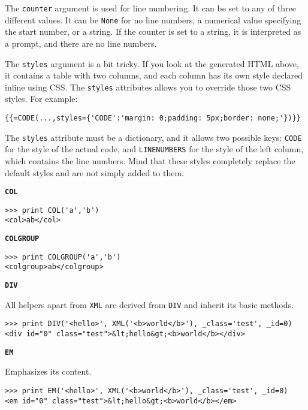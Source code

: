 \documentclass[justified,sixbynine,notoc]{tufte-book}
\def\ft{\small\tt}
\def\inxx#1{\index{#1}}
\begin{document}
\begin{fullwidth}
The {\ft counter} argument is used for line numbering. It can be set to any of three different values. It can be {\ft None} for no line numbers, a numerical value specifying the start number, or a string. If the counter is set to a string, it is interpreted as a prompt, and there are no line numbers.

The {\ft styles} argument is a bit tricky. If you look at the generated HTML above, it contains a table with two columns, and each column has its own style declared inline using CSS. The {\ft styles} attributes allows you to override those two CSS styles. For example:

\begin{lstlisting}[keywords={}]
{{=CODE(...,styles={'CODE':'margin: 0;padding: 5px;border: none;'})}}
\end{lstlisting}

The {\ft styles} attribute must be a dictionary, and it allows two possible keys: {\ft CODE} for the style of the actual code, and {\ft LINENUMBERS} for the style of the left column, which contains the line numbers. Mind that these styles completely replace the default styles and are not simply added to them.

{\bf {\ft COL}}

\inxx{COL}

\begin{lstlisting}
>>> print COL('a','b')
<col>ab</col>
\end{lstlisting}

{\bf {\ft COLGROUP}}

\inxx{COLGROUP}

\begin{lstlisting}
>>> print COLGROUP('a','b')
<colgroup>ab</colgroup>
\end{lstlisting}

{\bf {\ft DIV}}

All helpers apart from {\ft XML} are derived from {\ft DIV} and inherit its basic methods.

\inxx{DIV}
\begin{lstlisting}
>>> print DIV('<hello>', XML('<b>world</b>'), _class='test', _id=0)
<div id="0" class="test">&lt;hello&gt;<b>world</b></div>
\end{lstlisting}

{\bf {\ft EM}}

Emphasizes its content.

\inxx{EM}
\begin{lstlisting}
>>> print EM('<hello>', XML('<b>world</b>'), _class='test', _id=0)
<em id="0" class="test">&lt;hello&gt;<b>world</b></em>
\end{lstlisting}


\end{fullwidth}
\end{document}
